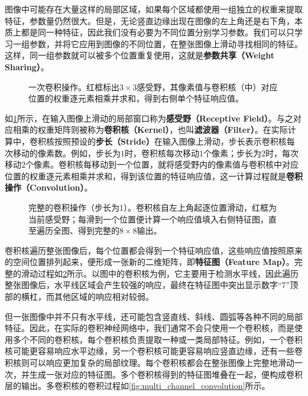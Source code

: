 图像中可能存在大量这样的局部区域，如果每个区域都使用一组独立的权重来提取特征，参数量仍然很大。但是，无论竖直边缘出现在图像的左上角还是右下角，本质上都是同一种特征，因此我们没有必要为不同位置分别学习参数。我们可以只学习一组参数，并将它应用到图像的不同位置，在整张图像上滑动寻找相同的特征。这样，同一组参数就可以被多个位置重复使用，这就是\textbf{参数共享（Weight Sharing）}。

\begin{figure}[H]
    \caption{一次卷积操作。红框标出$3\times 3$感受野，其像素值与卷积核（中）对应位置的权重逐元素相乘并求和，得到右侧单个特征响应值。}
    \label{fig:once_convolution_}
\end{figure}

如\cref{fig:once_convolution_}所示，在输入图像上滑动的局部窗口称为\textbf{感受野（Receptive Field）}。与之对应相乘的权重矩阵则被称为\textbf{卷积核（Kernel）}，也叫\textbf{滤波器（Filter）}。在实际计算中，卷积核按照预设的\textbf{步长（Stride）}在输入图像上滑动，步长表示卷积核每次移动的像素数。例如，步长为$1$时，卷积核每次移动$1$个像素；步长为$2$时，每次移动$2$个像素。卷积核每移动到一个位置，就将感受野内的像素值与卷积核中对应位置的权重逐元素相乘并求和，得到该位置的特征响应值，这一计算过程就是\textbf{卷积操作（Convolution）}。

\begin{figure}[H]
    \caption{完整的卷积操作（步长为1）。卷积核自左上角起逐位置滑动，红框为当前感受野；每滑到一个位置便计算一个响应值填入右侧特征图，直至遍历全图、得到完整的$8\times 8$输出。}
    \label{fig:full_convolution}
\end{figure}

卷积核遍历整张图像后，每个位置都会得到一个特征响应值，这些响应值按照原来的空间位置排列起来，便形成一张新的二维矩阵，即\textbf{特征图（Feature Map）}。完整的滑动过程如\cref{fig:full_convolution}所示。以图中的卷积核为例，它主要用于检测水平线，因此遍历整张图像后，水平线区域会产生较强的响应，最终在特征图中突出显示数字“7”顶部的横杠，而其他区域的响应相对较弱。

但一张图像中并不只有水平线，还可能包含竖直线、斜线、圆弧等各种不同的局部特征。因此，在实际的卷积神经网络中，我们通常不会只使用一个卷积核，而是使用多个不同的卷积核，每个卷积核负责提取一种或一类局部特征。例如，一个卷积核可能更容易响应水平边缘，另一个卷积核可能更容易响应竖直边缘，还有一些卷积核则可以响应更加复杂的局部纹理。每个卷积核都会在整张图像上完整地滑动一次，并生成一张对应的特征图。多个卷积核得到的特征图堆叠在一起，便构成卷积层的输出。多卷积核的卷积过程如\cref{fig:multi_channel_convolution}所示。


